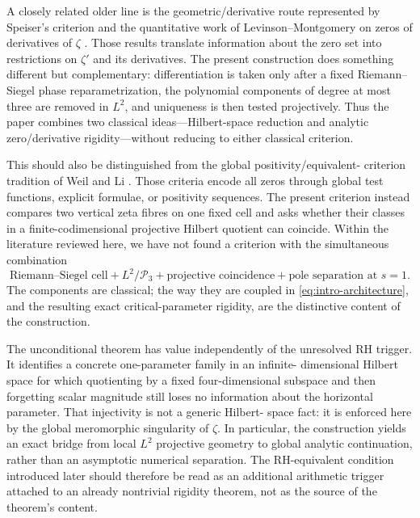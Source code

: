 \documentclass[11pt]{amsart}
\numberwithin{equation}{section}
\newcommand{\Pcal}{\mathcal P}
\begin{document}
A closely related older line is the geometric/derivative route represented by
Speiser's criterion and the quantitative work of Levinson--Montgomery on
zeros of derivatives of $\zeta$ \cite{Speiser1934,LevinsonMontgomery1974}.
Those results translate information about the zero set into restrictions on
$\zeta'$ and its derivatives.  The present construction does something
different but complementary: differentiation is taken only after a fixed
Riemann--Siegel phase reparametrization, the polynomial components of
degree at most three are removed in $L^2$, and uniqueness is then tested
projectively.  Thus the paper
combines two classical ideas---Hilbert-space reduction and analytic
zero/derivative rigidity---without reducing to either classical criterion.

This should also be distinguished from the global positivity/equivalent-
criterion tradition of Weil and Li \cite{Weil1952,Li1997,BombieriLagarias1999}.
Those criteria encode all zeros through global test functions, explicit
formulae, or positivity sequences.  The present criterion instead compares
two vertical zeta fibres on one fixed cell and asks whether their classes in a
finite-codimensional projective Hilbert quotient can coincide.  Within the
literature reviewed here, we have not found a criterion with the simultaneous
combination
\begin{equation}
 \boxed{
 \text{Riemann--Siegel cell}
 +L^2/\Pcal_3
 +\text{projective coincidence}
 +\text{pole separation at }s=1.
 }
 \label{eq:intro-architecture}
\end{equation}
The components are classical; the way they are coupled in
\eqref{eq:intro-architecture}, and the resulting exact critical-parameter
rigidity, are the distinctive content of the construction.

The unconditional theorem has value independently of the unresolved RH
trigger.  It identifies a concrete one-parameter family in an infinite-
dimensional Hilbert space for which quotienting by a fixed four-dimensional
subspace and then forgetting scalar magnitude still loses no information
about the horizontal parameter.  That injectivity is not a generic Hilbert-
space fact: it is enforced here by the global meromorphic singularity of
$\zeta$.  In particular, the construction yields an exact bridge from local
$L^2$ projective geometry to global analytic continuation, rather than an
asymptotic numerical separation.  The RH-equivalent condition introduced
later should therefore be read as an additional arithmetic trigger attached
to an already nontrivial rigidity theorem, not as the source of the theorem's
content.
\end{document}

